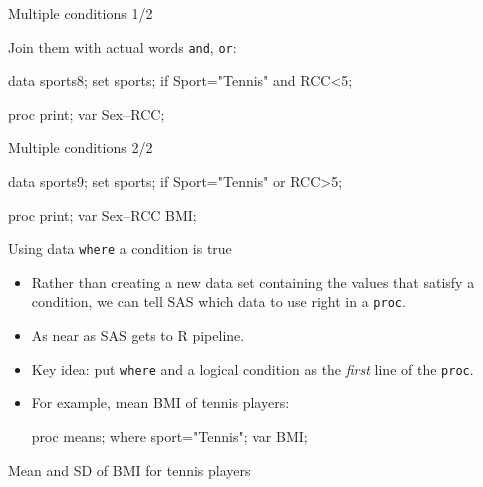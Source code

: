 \documentclass[unknownkeysallowed]{beamer}\usepackage[]{graphicx}\usepackage[]{color}
\begin{document}
\begin{frame}[fragile]{Multiple conditions 1/2}
  
  Join them with actual words \texttt{and}, \texttt{or}:
  
  \begin{Datastep}
data sports8;
  set sports;
  if Sport="Tennis" and RCC<5;
  \end{Datastep}
  
  \begin{Sascode}[store=th]
proc print;
  var Sex--RCC;
  \end{Sascode}
  
  
\end{frame}

\begin{frame}[fragile]{Multiple conditions 2/2}
  
  \begin{Datastep}
data sports9;
  set sports;
  if Sport="Tennis" or RCC>5;
  \end{Datastep}
  
  \begin{Sascode}[store=ti]
proc print;
  var Sex--RCC BMI;
  \end{Sascode}
  
\end{frame}

\begin{frame}[fragile]{Using data \texttt{where} a condition is true}
  
  \begin{itemize}
  \item Rather than creating a new data set containing the values that
    satisfy a condition, we can tell SAS which data to use right in a
    \texttt{proc}.
  \item As near as SAS gets to R pipeline.
  \item Key idea: put \texttt{where} and a logical condition as the
    \emph{first} line of the \texttt{proc}.
  \item For example, mean BMI of tennis players:
    \begin{Sascode}[store=zawis]
proc means;
  where sport="Tennis";
  var BMI;
    \end{Sascode}
  \end{itemize}
  
\end{frame}

\begin{frame}[fragile]{Mean and SD of BMI for tennis players}
  
  
\end{frame}
\end{document}
